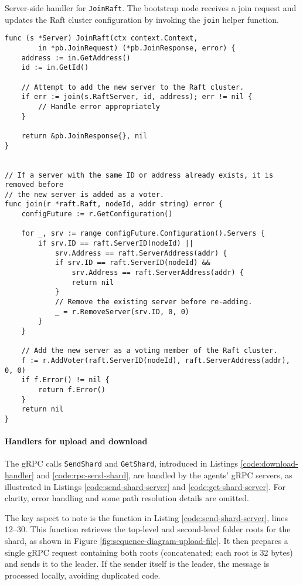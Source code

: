 \begin{listing}[H]
\caption{Server-side handler for \texttt{JoinRaft}. The bootstrap node receives a join request and updates the Raft cluster configuration by invoking the \texttt{join} helper function.}
\label{code:grpc-response-join-request}
\begin{verbatim}
func (s *Server) JoinRaft(ctx context.Context,
        in *pb.JoinRequest) (*pb.JoinResponse, error) {
    address := in.GetAddress()
    id := in.GetId()

    // Attempt to add the new server to the Raft cluster.
    if err := join(s.RaftServer, id, address); err != nil {
        // Handle error appropriately
    }

    return &pb.JoinResponse{}, nil
}


// If a server with the same ID or address already exists, it is removed before
// the new server is added as a voter.
func join(r *raft.Raft, nodeId, addr string) error {
    configFuture := r.GetConfiguration()

    for _, srv := range configFuture.Configuration().Servers {
        if srv.ID == raft.ServerID(nodeId) ||
            srv.Address == raft.ServerAddress(addr) {
            if srv.ID == raft.ServerID(nodeId) &&
                srv.Address == raft.ServerAddress(addr) {
                return nil
            }
            // Remove the existing server before re-adding.
            _ = r.RemoveServer(srv.ID, 0, 0)
        }
    }

    // Add the new server as a voting member of the Raft cluster.
    f := r.AddVoter(raft.ServerID(nodeId), raft.ServerAddress(addr), 0, 0)
    if f.Error() != nil {
        return f.Error()
    }
    return nil
}
\end{verbatim}
\end{listing}
\paragraph{Handlers for 
upload and download}

The gRPC calls \texttt{SendShard} and \texttt{GetShard}, introduced in Listings \ref{code:download-handler} and \ref{code:rpc-send-shard}, are handled by the agents’ gRPC servers, as illustrated in Listings \ref{code:send-shard-server} and \ref{code:get-shard-server}. For clarity, error handling and some path resolution details are omitted.

The key aspect to note is the function in Listing \ref{code:send-shard-server}, lines 12–30. This function retrieves the top-level and second-level folder roots for the shard, as shown in Figure \ref{fig:sequence-diagram-upload-file}. It then prepares a single gRPC request containing both roots (concatenated; each root is 32 bytes) and sends it to the leader. If the sender itself is the leader, the message is processed locally, avoiding duplicated code.

